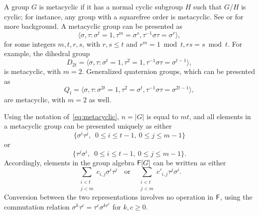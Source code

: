 A group $G$ is metacyclic if it has a normal cyclic subgroup $H$ such
that $G/H$ is cyclic; for instance, any group with a squarefree order
is metacyclic. See \cite[p.~88]{Johnson} or \cite[p.~334]{Curtis} for
more background. A metacyclic group can be presented as
\begin{equation}\label{eq:metacyclic}
  \langle \sigma,\tau: \sigma^t = 1,  \tau^m = \sigma^s, \tau^{-1}\sigma \tau = \sigma^r \rangle,
\end{equation}
for some integers $m,t,r,s$, with $r,s \leq t$ and $r^m = 1 \bmod t, rs
= s \bmod t$. For example,
the dihedral group 
$$D_{2t} = \langle \sigma,\tau: \sigma^t =1, \tau^2 = 1, \tau^{-1}
\sigma \tau = \sigma^{t-1} \rangle, $$ is metacyclic, with
$m=2$. Generalized quaternion groups, which can be presented as
$$Q_t = \langle \sigma,\tau: \sigma^{2t} =1, \tau^2 = \sigma^t,
\tau^{-1} \sigma \tau = \sigma^{2t-1} \rangle,$$ are metacyclic, with
$m=2$ as well.

Using the notation of~\eqref{eq:metacyclic}, $n=|G|$ is equal to $mt$,
and all elements in a metacyclic group can be presented uniquely as
either
\begin{equation}\label{pres1}
\{\sigma^i \tau^j,\,\,\, 0\leq i \leq t-1,\ 0\leq j \leq m-1\}  
\end{equation}
or
\begin{equation}\label{pres2}
\{ \tau^j\sigma^i,\,\,\, 0\leq i \leq t-1,\ 0\leq j \leq m-1\}.
\end{equation}
Accordingly, elements in the group algebra ${\mathsf{F}}[G]$ can be written as 
either 
$$\sum_{\substack{i <t\\ j< m}} c_{i,j} \sigma^i \tau^j \quad\text{or}\quad
\sum_{\substack{i <t\\ j< m}} c'_{i,j} \tau^j \sigma^i.$$
Conversion between the two representations involves no operation in ${\mathsf{F}}$,
using the commutation relation $\sigma^k \tau^c = \tau^c \sigma^{kr^c}$
for $k,c \ge 0$.

